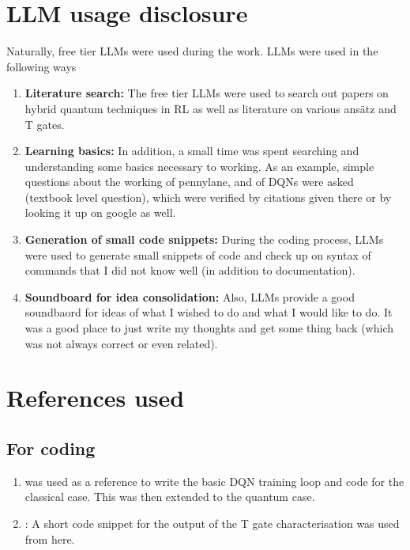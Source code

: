 \documentclass{article}
\begin{document}
\section{LLM usage disclosure}
Naturally, free tier LLMs were used during the work. LLMs were used in the following ways 
\begin{enumerate}
    \item \textbf{Literature search:} The free tier LLMs were used to search out papers on hybrid quantum techniques in RL as well as literature on various ans{\"a}tz and T gates.
    \item \textbf{Learning basics:} In addition, a small time was spent searching and understanding some basics necessary to working. As an example, simple questions about the working of pennylane, and of DQNs were asked (textbook level question), which were verified by citations given there or by looking it up on google as well.
    \item \textbf{Generation of small code snippets:} During the coding process, LLMs were used to generate small snippets of code and check up on syntax of commands that I did not know well (in addition to documentation).
    \item \textbf{Soundboard for idea consolidation:} Also, LLMs provide a good soundbaord for ideas of what I wished to do and what I would like to do. It was a good place to just write my thoughts and get some thing back (which was not always correct or even related).
\end{enumerate}
\section{References used }
\subsection{For coding}
\begin{enumerate}
    \item {} was used as a reference to write the basic DQN training loop and code for the classical case. This was then extended to the quantum case.
    \item {}: A short code snippet for the output of the T gate characterisation was used from here.
\end{enumerate}
\end{document}
